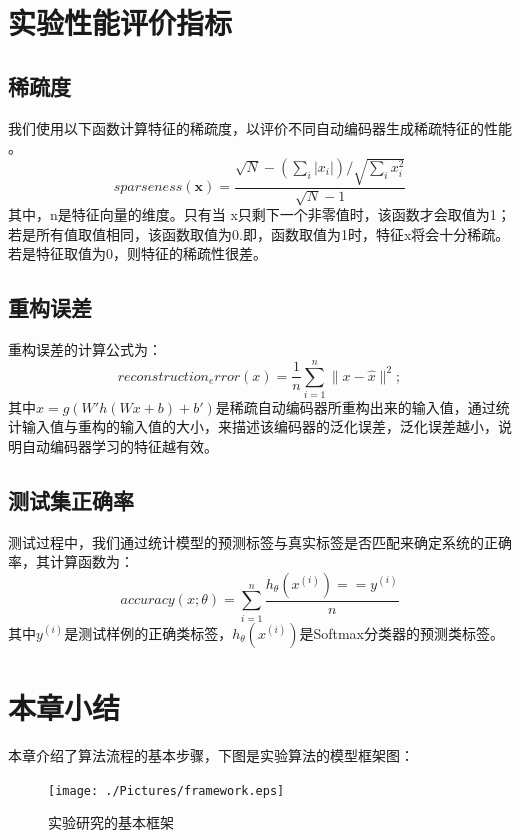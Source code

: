 \documentclass[oneside]{ZJUthesis}
\begin{document}
\section{实验性能评价指标}
\subsection{稀疏度}
我们使用以下函数计算特征的稀疏度，以评价不同自动编码器生成稀疏特征的性能 \cite{DBLP:journals/jmlr/Hoyer04}。
\begin{equation}
sparseness(\textbf{x}) = \frac{\sqrt{N} - (\sum_i{|x_i|}) / \sqrt{\sum_i{x_i^2}}}{\sqrt{N} - 1}
\end{equation}
其中，n是特征向量的维度。只有当 x只剩下一个非零值时，该函数才会取值为1；若是所有值取值相同，该函数取值为0.即，函数取值为1时，特征x将会十分稀疏。若是特征取值为0，则特征的稀疏性很差。

\subsection{重构误差}
重构误差的计算公式为：
\begin{equation}
	reconstruction_error(x)=\frac{1}{n}\sum\limits_{i=1}^{n}{\|x-\hat x\|^2};
\end{equation}
其中$\hat x=g(W'h(Wx+b)+b')$是稀疏自动编码器所重构出来的输入值，通过统计输入值与重构的输入值的大小，来描述该编码器的泛化误差，泛化误差越小，说明自动编码器学习的特征越有效。

\subsection{测试集正确率}
测试过程中，我们通过统计模型的预测标签与真实标签是否匹配来确定系统的正确率，其计算函数为：
\begin{equation}
	accuracy(x;\theta)=\sum\limits_{i=1}^{n}{\frac{h_{\theta}(x^{(i)})==y^{(i)}}{n}}
\end{equation}
其中$y^{(i)}$是测试样例的正确类标签，$h_{\theta}(x^{(i)})$是Softmax分类器的预测类标签。

\section{本章小结}
本章介绍了算法流程的基本步骤，下图是实验算法的模型框架图：
\begin{figure}[h]
\centering
\texttt{[image: ./Pictures/framework.eps]}
\caption{实验研究的基本框架\label{fig:framework}}
\end{figure}
\end{document}
